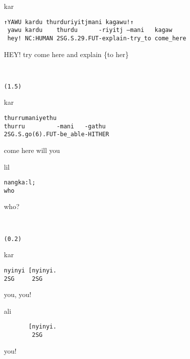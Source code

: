 \documentclass[output=paper,nonflat,colorlinks,citecolor=brown]{langsci/langscibook}
\begin{document}
\vspace{-1mm}
%
\begin{mdframednoverticalspace}[style=firstfoc]
\begin{transbox}{1}{kar}
\begin{verbatim}
↑YAWU kardu thurduriyitjmani kagawu!↑
 yawu kardu    thurdu      -riyitj –mani   kagaw
 hey! NC:HUMAN 2SG.S.29.FUT-explain-try_to come_here
\end{verbatim}
\hspace{0.07cm} HEY! try come here and explain \{to her\}
\end{transbox}
\end{mdframednoverticalspace}
%
\begin{transbox}{2}{~}
\begin{verbatim}
(1.5)
\end{verbatim}
\end{transbox}
%
\begin{mdframednoverticalspace}[style=firstfoc]
\begin{transbox}{3}{kar}
\begin{verbatim}
thurrumaniyethu
thurru         -mani   -gathu
2SG.S.go(6).FUT-be_able-HITHER
\end{verbatim}
come here will you
\end{transbox}
\end{mdframednoverticalspace}
%
%
\begin{mdframednoverticalspace}[style=secondfoc]
\begin{transbox}{5}{lil}
\begin{verbatim}
nangka:l;
who
\end{verbatim}
who?
\end{transbox}
\end{mdframednoverticalspace} %
%
\begin{transbox}{6}{~}
\begin{verbatim}
(0.2)
\end{verbatim}
\end{transbox}
%
\begin{transbox}{7}{kar}
\begin{verbatim}
nyinyi [nyinyi.
2SG     2SG
\end{verbatim}
you, you!
\end{transbox}
%
\begin{transbox}{8}{ali}
\begin{verbatim}
       [nyinyi.
        2SG
\end{verbatim}
\hspace{1.1cm} you!
\end{transbox}
\end{document}
